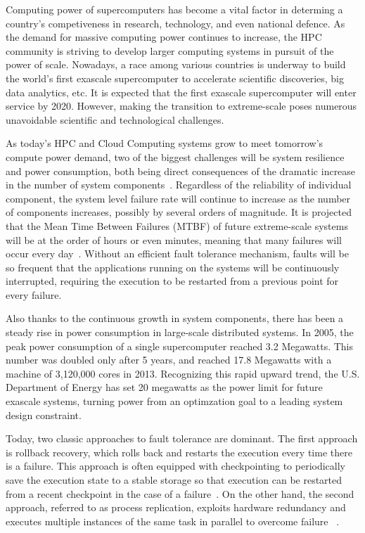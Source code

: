 Computing power of supercomputers has become a vital factor in determing a country's competiveness in research, technology, and even national defence. As the demand for massive computing power continues to increase, the HPC community is striving to develop larger computing systems in pursuit of the power of scale. Nowadays,  
a race among various countries is underway to build the world's first exascale supercomputer 
to accelerate scientific discoveries, big data analytics, etc. It is expected that the first exascale supercomputer will enter service by 2020. 
However, making the transition to extreme-scale poses numerous unavoidable scientific and technological challenges.


As today's HPC and Cloud Computing systems grow to 
meet tomorrow's compute power demand, two of the biggest challenges will be system resilience and power 
consumption, both being direct consequences of the dramatic increase in the number of system components~\cite{exa_challenge_2010,snir2014addressing}. Regardless of the reliability of individual component, the system level failure rate will continue to increase as the number of 
components increases, possibly by several orders of magnitude. It is projected that the Mean Time Between Failures (MTBF) of future extreme-scale systems will be at the order of hours or even minutes, meaning 
that many failures will occur every day~\cite{Bergman08exascalecomputing}. Without an efficient fault tolerance mechanism, faults will be so frequent that the applications running on the 
systems will be continuously interrupted, requiring the execution to be restarted from a previous point for every failure. 

Also thanks to the continuous growth in system components, there has been a steady rise in power consumption in large-scale distributed systems. 
In 2005, the peak power consumption of a single supercomputer reached 3.2 Megawatts. This number was doubled only after 5 years, and reached 17.8 
Megawatts with a machine of 3,120,000 cores in 2013. Recognizing this rapid upward trend, the U.S. Department of Energy has set 20 
megawatts as the power limit for future exascale systems, 
turning power from an optimzation goal to a leading system design constraint. 

Today, two classic approaches to fault tolerance are dominant. The first approach is rollback recovery, which rolls back and restarts the execution 
every time there is a failure. This approach is often equipped with checkpointing to periodically save the execution state to a 
stable storage so that execution can be restarted from a recent checkpoint in the case of a failure~\cite{Elnozahy:02:Survey,kalaiselvi_sadhana_2000,Chandy:1985:DSD:214451.214456}. On the other hand, the second approach, referred to as process replication, exploits hardware redundancy and executes multiple instances of the same task 
in parallel to overcome failure%
~\cite{bartlett_1981_nonstop,tsai_isads_2011,ferreira_sc_2011}. 


